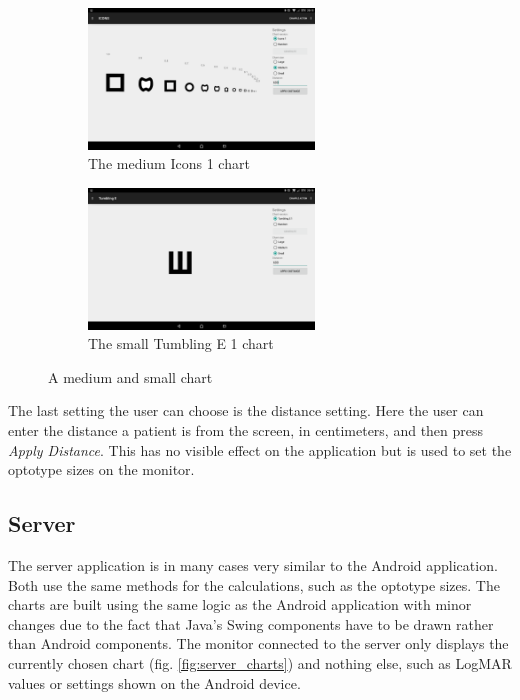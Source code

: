 \documentclass[12pt,a4paper,notitlepage]{report}
\begin{document}
\begin{figure}[ht!]
\centering
\begin{subfigure}{.5\textwidth}
  \centering
  \includegraphics[width=60mm]{images/appgui/icons_medium.png}
  \caption{The medium Icons 1 chart}
  \label{fig:icons_medium}
\end{subfigure}%
\begin{subfigure}{.5\textwidth}
  \centering
  \includegraphics[width=60mm]{images/appgui/tumbling_e_small.png}
  \caption{The small Tumbling E 1 chart}
  \label{fig:tumbling_e_small}
\end{subfigure}
\caption{A medium and small chart}
\label{fig:chart_medium_small}
\end{figure}

The last setting the user can choose is the distance setting. Here the user can enter the distance a patient is from the screen, in centimeters, and then press \textit{Apply Distance}. This has no visible effect on the application but is used to set the optotype sizes on the monitor.

\subsection{Server}
The server application is in many cases very similar to the Android application. Both use the same methods for the calculations, such as the optotype sizes. The charts are built using the same logic as the Android application with minor changes due to the fact that Java's Swing components have to be drawn rather than Android components. The monitor connected to the server only displays the currently chosen chart (fig. \ref{fig:server_charts}) and nothing else, such as LogMAR values or settings shown on the Android device.
\end{document}
